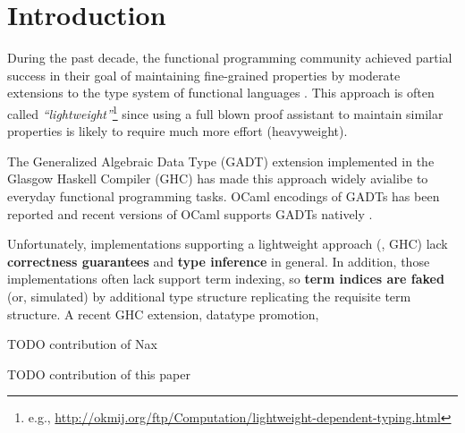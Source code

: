 \section{Introduction}
During the past decade, the functional programming community achieved
partial success in their goal of maintaining fine-grained properties
by moderate extensions to the type system of functional languages
\cite{CheHin03,CheHin02,Xi03}.
This approach is often called \emph{``lightweight''}\footnote{e.g.,
  \url{http://okmij.org/ftp/Computation/lightweight-dependent-typing.html} }
since using a full blown proof assistant to maintain similar properties
is likely to require much more effort (heavyweight).

The Generalized Algebraic Data Type (GADT) extension implemented
in the Glasgow Haskell Compiler (GHC) has made this approach
widely avialibe to everyday functional programming tasks.
OCaml encodings of GADTs has been reported \cite{ManStu09}
and recent versions of OCaml supports GADTs natively \cite{GarNor11}.

Unfortunately, implementations supporting a lightweight approach (\eg, GHC)
lack \textbf{correctness guarantees} and \textbf{type inference} in general.
In addition, those implementations often lack support term indexing,
so \textbf{term indices are faked} (or, simulated) by additional
type structure replicating the requisite term structure.
A recent GHC extension, datatype promotion,

TODO contribution of Nax

TODO contribution of this paper

